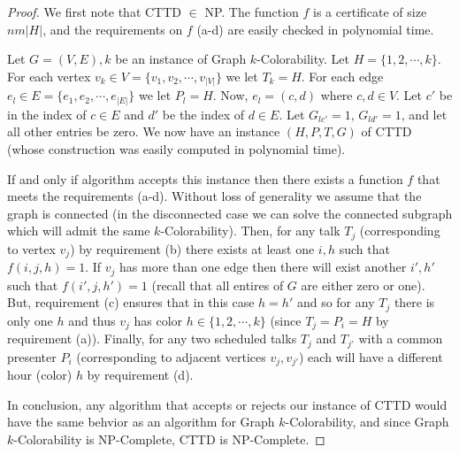 \documentclass[]{article}
\theoremstyle{definition}
\theoremstyle{remark}
\numberwithin{equation}{section}
\begin{document}
\begin{proof}
We first note that CTTD $\in$ NP. The function $f$ is a certificate of size $nm|H|$, and the requirements on $f$ (a-d) are easily checked in polynomial time.

Let $G=(V,E),k$ be an instance of Graph $k$-Colorability. Let $H=\{1, 2, \cdots, k\}$. For each vertex $v_k \in V=\{v_1, v_2, \cdots, v_{|V|}\}$ we let $T_k = H$. For each edge $e_l \in E=\{e_1, e_2, \cdots, e_{|E|}\}$ we let $P_l = H$. Now, $e_l = (c,d)$ where $c,d \in V$. Let $c'$ be in the index of $c \in E$ and $d'$ be the index of $d \in E$. Let $G_{lc'} = 1$, $G_{ld'} = 1$, and let all other entries be zero. We now have an instance $(H, P, T, G)$ of CTTD (whose construction was easily computed in polynomial time). 

If and only if algorithm accepts this instance then there exists a function $f$ that meets the requirements (a-d). Without loss of generality we assume that the graph is connected (in the disconnected case we can solve the connected subgraph which will admit the same $k$-Colorability). Then, for any talk $T_j$ (corresponding to vertex $v_j$)  by requirement (b) there exists at least one $i, h$ such that $f(i,j,h) = 1$. If $v_j$ has more than one edge then there will exist another $i',h'$ such that $f(i',j,h')=1$ (recall that all entires of $G$ are either zero or one). But, requirement (c) ensures that in this case $h=h'$ and so for any $T_j$ there is only one $h$ and thus $v_j$ has color $h \in \{1,2,\cdots,k\}$ (since $T_j=P_i=H$ by requirement (a)). Finally, for any two scheduled talks $T_j$ and $T_{j'}$ with a common presenter $P_i$ (corresponding to adjacent vertices $v_j, v_{j'}$) each will have a different hour (color) $h$ by requirement (d).

In conclusion, any algorithm that accepts or rejects our instance of CTTD would have the same behvior as an algorithm for Graph $k$-Colorability, and since Graph $k$-Colorability is NP-Complete, CTTD is NP-Complete.
\end{proof}
\end{document}

